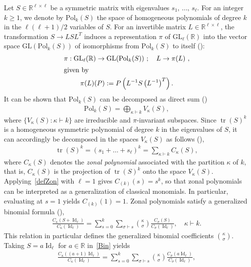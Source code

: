 \documentclass[AHL,Unicode,longabstracts,published]{cedram}
\DeclareMathOperator{\Id}{Id}
\DeclareMathOperator{\Tr}{tr}
\newcommand{\Pol}{\mathrm{Pol}}
\newcommand{\GL}{\mathrm{GL}}
\newcommand{\R}{\mathbb{R}}
\begin{document}
Let $S \in \R^{\ell \times \ell}$ be a symmetric matrix with eigenvalues $s_1,\,\ldots,\,s_{\ell}$. For an integer $k\geq 1$, we denote by $\Pol_{k}(S)$ the space of homogeneous polynomials of degree $k$ in the $\ell(\ell+1)/2$ variables of $S$. For an invertible matrix $L \in \R^{\ell \times \ell}$, the transformation $S \to LSL^T$ induces a representation $\pi$ of $\GL_{\ell}(\R)$ into the vector space $\GL(\Pol_{k}(S))$ of isomorphisms from $\Pol_{k}(S)$ to itself (\cite[Eq.~(A.2.1)]{Ch2012}):
\begin{gather*}
\pi : \GL_{\ell}(\R) \to
\GL(\Pol_{k}(S)) \ ; \quad L \to \pi(L) \ ,
\\
\intertext{given by}
\pi(L)(P):= P\left(L^{-1}S\left(L^{-1}\right)^T\right).
\end{gather*}
It can be shown that $\Pol_k(S)$ can be decomposed as direct sum (\cite[p.~297]{Ch2012})
\begin{gather}\label{Eq:Pol}
\Pol_k(S) = \bigoplus_{\kappa \vdash k} V_{\kappa}(S),
\end{gather}
where $\{V_{\kappa}(S): \kappa \vdash k\}$ are irreducible and $\pi$-invariant subspaces. Since $\Tr(S)^k$ is a homogeneous symmetric polynomial of degree $k$ in the eigenvalues of $S$, it can accordingly be decomposed in the spaces $V_{\kappa}(S)$ as follows (\cite[Eq.~(4.3.38)]{BFZP}),
\begin{gather}\label{defZon}
\Tr(S)^k = (s_1+\ldots+s_{\ell})^k = \sum_{\kappa \vdash k} C_{\kappa}(S),
\end{gather}
where $C_{\kappa}(S)$ denotes the \emph{zonal polynomial} associated with the partition $\kappa$ of $k$, that is, $C_{\kappa}(S)$ is the projection of $\Tr(S)^k $ onto the space $V_{\kappa}(S)$. Applying~\eqref{defZon} with $\ell=1$ gives $C_{(k)}(s)=s^k$, so that zonal polynomials can be interpreted as a generalization of classical monomials. In particular, evaluating at $s=1$ yields $C_{(k)}(1)=1$. Zonal polynomials satisfy a generalized binomial formula (\cite[Eq.~(4.5.1)]{BFZP}),
\begin{gather}\label{Bin}
\frac{C_{\kappa}(S+\Id_{\ell})}{C_{\kappa}(\Id_{\ell})} = \sum_{s=0}^{k} \sum_{\sigma \vdash s} \binom{\kappa}{\sigma} \frac{C_{\sigma}(S)}{C_{\sigma}(\Id_{\ell}) }, \quad \kappa \vdash k.
\end{gather}
This relation in particular defines the generalized binomial coefficients $\binom{\kappa}{\sigma}$. Taking $S=a\Id_{\ell}$ for $a \in \R$ in~\eqref{Bin} yields
\begin{gather*}
\frac{C_{\kappa}((a+1)\Id_{\ell})}{C_{\kappa}(\Id_{\ell})} =
\sum_{s=0}^{k}
\sum_{\sigma \vdash s} \binom{\kappa}{\sigma} \frac{C_{\sigma}(a \Id_{\ell})}{C_{\sigma}(\Id_{\ell}) },
\end{gather*}
\end{document}
